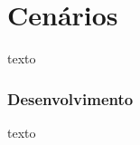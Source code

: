
\chapter{Cenários\label{chap:Desenvolvimento}}


texto

\subsection{Desenvolvimento}

texto \cite{vogt2002multiple}


